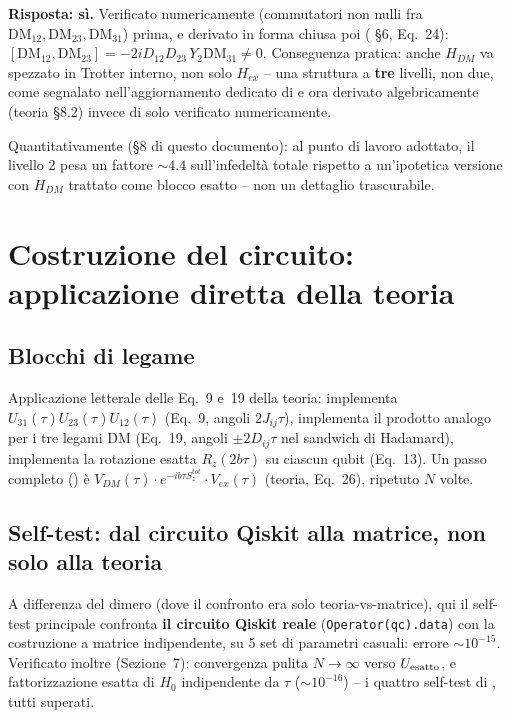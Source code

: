 \documentclass[11pt,a4paper]{article}
\begin{document}
\textbf{Risposta: sì.} Verificato numericamente (commutatori non nulli
fra $\text{DM}_{12},\text{DM}_{23},\text{DM}_{31}$) prima, e derivato in
forma chiusa poi (\texttt{}
\S6, Eq.~24): $[\text{DM}_{12},\text{DM}_{23}]=-2iD_{12}D_{23}\,Y_2\text{DM}_{31}\neq0$.
Conseguenza pratica: anche $H_{DM}$ va spezzato in Trotter interno, non
solo $H_{ex}$ -- una struttura a \textbf{tre} livelli, non due, come
segnalato nell'aggiornamento dedicato di \texttt{} e ora
derivato algebricamente (teoria \S8.2) invece di solo verificato
numericamente.

Quantitativamente (\S8 di questo documento): al punto di lavoro adottato,
il livello 2 pesa un fattore $\sim4.4$ sull'infedeltà totale rispetto a
un'ipotetica versione con $H_{DM}$ trattato come blocco esatto -- non un
dettaglio trascurabile.

\section{Costruzione del circuito: applicazione diretta della teoria}

\subsection{Blocchi di legame}

Applicazione letterale delle Eq.~9 e~19 della teoria: \texttt{}
implementa $U_{31}(\tau)U_{23}(\tau)U_{12}(\tau)$ (Eq.~9, angoli
$2J_{ij}\tau$), \texttt{} implementa il prodotto analogo per i
tre legami DM (Eq.~19, angoli $\pm2D_{ij}\tau$ nel sandwich di Hadamard),
\texttt{} implementa la rotazione esatta $R_z(2b\tau)$ su
ciascun qubit (Eq.~13). Un passo completo (\texttt{}) è
$V_{DM}(\tau)\cdot e^{-ib\tau S_z^{tot}}\cdot V_{ex}(\tau)$ (teoria,
Eq.~26), ripetuto $N$ volte.

\subsection{Self-test: dal circuito Qiskit alla matrice, non solo alla teoria}

A differenza del dimero (dove il confronto era solo teoria-vs-matrice),
qui il self-test principale confronta \textbf{il circuito Qiskit reale}
(\texttt{Operator(qc).data}) con la costruzione a matrice indipendente,
su 5 set di parametri casuali: errore $\sim10^{-15}$. Verificato inoltre
(Sezione~7): convergenza pulita $N\to\infty$ verso $U_{\rm esatto}$, e
fattorizzazione esatta di $H_0$ indipendente da $\tau$ ($\sim10^{-16}$) --
i quattro self-test di \texttt{}, tutti
superati.
\end{document}
